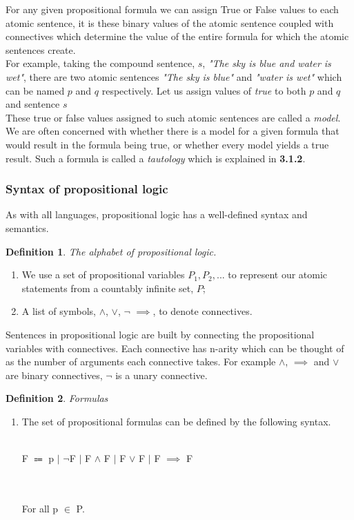 \documentclass{article}%
\newtheorem{definition}{Definition}
\begin{document}
For any given propositional formula we can assign True or False values to each atomic sentence, it is these binary values of the atomic sentence coupled with connectives which determine the value of the entire formula for which the atomic sentences create.\\ 
For example, taking the compound sentence, $s$, \textit{"The sky is blue and water is wet"}, there are two atomic sentences \textit{"The sky is blue"} and \textit{"water is wet"} which can be named $p$ and $q$ respectively. Let us assign values of \textit{true} to both $p$ and $q$ and sentence $s$  \\  
These true or false values assigned to such atomic sentences are called a \textit{model}. We are often concerned with whether there is a model for a given formula that would result in the formula being true, or whether every model yields a true result. Such a formula is called a \textit{tautology} which is explained in \textbf{3.1.2}.
\subsubsection{Syntax of propositional logic}
As with all languages, propositional logic has a well-defined syntax and semantics. 
\begin{definition}
The alphabet of propositional logic.
\end{definition}
\begin{enumerate}
\item We use a set of propositional variables $P_1, P_2, ... $ to represent our atomic statements from a countably infinite set, $P$;
\item A list of symbols, $\land$, $\lor$, $\neg$  $\implies$, to denote connectives.
\end{enumerate}

Sentences in propositional logic are built by connecting the propositional variables with connectives. Each connective has n-arity which can be thought of as the number of arguments each connective takes. For example $\land$, $\implies$ and $\lor$ are binary connectives, $\neg$ is a unary connective. 
\begin{definition}
Formulas
\end{definition}
\begin{enumerate}
\item The set of propositional formulas can be defined by the following syntax.\\\\
\centerline{ F $\Coloneqq$ p $\vert$  $\neg$F $\vert$  F $\land$ F $\vert$  F $\lor$ F $\vert$ F $\implies$ F } \\\\
For all p $\in$ P.
\end{enumerate}
\end{document}
